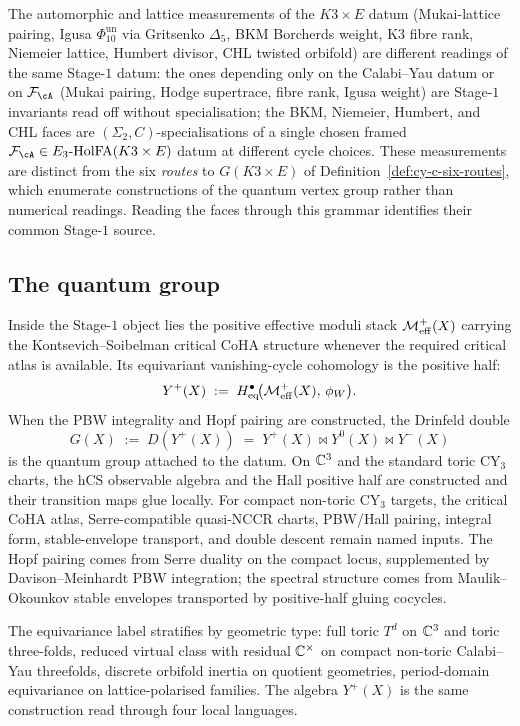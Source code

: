 The automorphic and lattice measurements of the $K3 \times E$ datum
(Mukai-lattice pairing, Igusa $\Phi_{10}^{\mathrm{un}}$ via Gritsenko $\Delta_5$, BKM
Borcherds weight, K3 fibre rank, Niemeier lattice, Humbert divisor,
CHL twisted orbifold) are different readings of the same
Stage-$1$ datum: the ones depending only on the Calabi--Yau datum or on
$\cF_\cA$ (Mukai pairing, Hodge supertrace, fibre rank, Igusa weight) are
Stage-$1$ invariants read off without specialisation; the BKM, Niemeier,
Humbert, and CHL faces are
$(\Sigma_2, C)$-specialisations of a single chosen framed
$\cF_\cA \in E_3\text{-}\HolFA(K3 \times E)$ datum at different cycle
choices. These measurements are distinct from the six \emph{routes} to
$G(K3 \times E)$ of Definition~\ref{def:cy-c-six-routes}, which enumerate
constructions of the quantum vertex group rather than numerical readings.
Reading the faces through this grammar identifies their
common Stage-$1$ source.

\subsection{The quantum group}
\label{wn:sec:platonic-intro-quantum-group}

Inside the Stage-$1$ object lies the positive effective moduli stack
$\mathcal{M}^{+}_{\mathrm{eff}}(X)$ carrying the Kontsevich--Soibelman critical CoHA structure
whenever the required critical atlas is available. Its equivariant
vanishing-cycle cohomology is the positive half:
\[
Y^+(X) \;:=\; H^{\bullet}_{\mathrm{eq}}\!\bigl(\mathcal{M}^{+}_{\mathrm{eff}}(X),\,\phi_W\bigr).
\]
When the PBW integrality and Hopf pairing are constructed, the
Drinfeld double
\[
G(X) \;:=\; D(Y^+(X)) \;=\; Y^+(X) \bowtie Y^0(X) \bowtie Y^-(X)
\]
is the quantum group attached to the datum. On $\mathbb{C}^3$ and the standard
toric CY$_3$ charts, the hCS observable algebra and the Hall positive
half are constructed and their transition maps glue locally. For
compact non-toric CY$_3$ targets, the critical CoHA atlas,
Serre-compatible quasi-NCCR charts, PBW/Hall pairing, integral form,
stable-envelope transport, and double descent remain named inputs. The
Hopf pairing comes from Serre duality on the compact locus,
supplemented by Davison--Meinhardt PBW integration; the spectral
structure comes from Maulik--Okounkov stable envelopes transported by
positive-half gluing cocycles.

The equivariance label stratifies by geometric type: full toric $T^d$
on $\mathbb{C}^3$ and toric three-folds, reduced virtual class with residual
$\mathbb{C}^\times$ on compact non-toric Calabi--Yau threefolds, discrete
orbifold inertia on quotient geometries, period-domain equivariance
on lattice-polarised families. The algebra $Y^+(X)$ is the same
construction read through four local languages.

